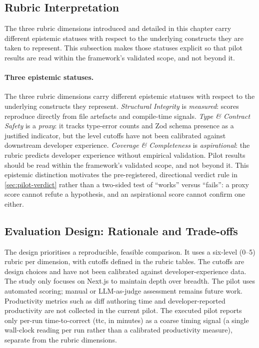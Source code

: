 \documentclass[12pt,a4paper]{report}
\begin{document}
\newpage 

\subsection{Rubric Interpretation}
\label{sec:rubric-interpretation}

The three rubric dimensions introduced and detailed in this chapter carry different epistemic statuses with respect to the underlying constructs they are taken to represent. This subsection makes those statuses explicit so that pilot results are read within the framework's validated scope, and not beyond it.

\paragraph{Three epistemic statuses.}
The three rubric dimensions carry different epistemic statuses with respect
to the underlying constructs they represent. \emph{Structural Integrity} is
\emph{measured}: scores reproduce directly from file artefacts and
compile-time signals. \emph{Type \& Contract Safety} is a \emph{proxy}: it
tracks type-error counts and Zod schema presence as a justified indicator,
but the level cutoffs have not been calibrated against downstream developer
experience. \emph{Coverage \& Completeness} is \emph{aspirational}: the
rubric predicts developer experience without empirical validation. Pilot
results should be read within the framework's validated scope, and not
beyond it. This epistemic distinction motivates the pre-registered,
directional verdict rule in \autoref{sec:pilot-verdict} rather than a
two-sided test of ``works'' versus ``fails'': a proxy score cannot refute
a hypothesis, and an aspirational score cannot confirm one either. 

\subsection{Evaluation Design: Rationale and Trade-offs}
\label{sec:design-rationale}

The design prioritises a reproducible, feasible comparison. It uses a six-level (0--5) rubric per dimension, with cutoffs defined in the rubric tables. The cutoffs are design choices and have not been calibrated against developer-experience data. The study only focuses on Next.js to maintain depth over breadth. The pilot uses automated scoring; manual or LLM-as-judge assessment remains future work. Productivity metrics such as diff authoring time and developer-reported productivity \parencite{beller2025dat} are not collected in the current pilot. The executed pilot reports only per-run time-to-correct (ttc, in minutes) as a coarse timing signal (a single wall-clock reading per run rather than a calibrated productivity measure), separate from the rubric dimensions.
\end{document}

